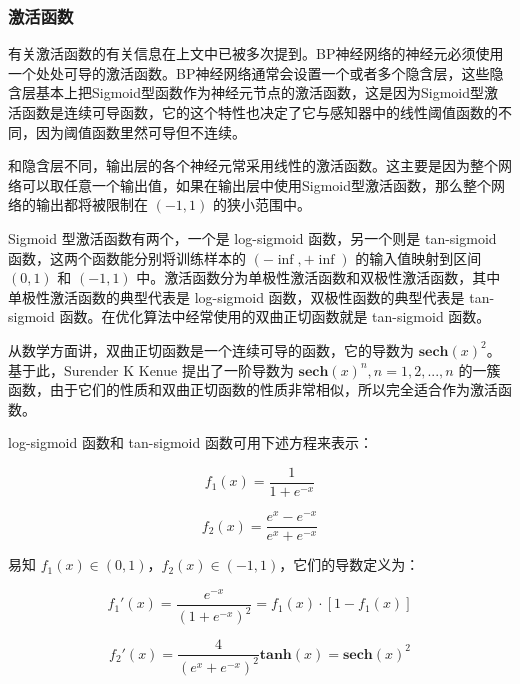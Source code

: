 \documentclass[UTF8]{ctexart}
\begin{document}
\subsubsection{激活函数}

有关激活函数的有关信息在上文中已被多次提到。BP神经网络的神经元必须使用一个处处可导的激活函数。BP神经网络通常会设置一个或者多个隐含层，这些隐含层基本上把Sigmoid型函数作为神经元节点的激活函数，这是因为Sigmoid型激活函数是连续可导函数，它的这个特性也决定了它与感知器中的线性阈值函数的不同，因为阈值函数里然可导但不连续。 \par

和隐含层不同，输出层的各个神经元常采用线性的激活函数。这主要是因为整个网络可以取任意一个输出值，如果在输出层中使用Sigmoid型激活函数，那么整个网络的输出都将被限制在 $(-1,1)$ 的狭小范围中。 \par

Sigmoid 型激活函数有两个，一个是 log-sigmoid 函数，另一个则是 tan-sigmoid 函数，这两个函数能分别将训练样本的 $(-\inf, + \inf)$ 的输入值映射到区间 $(0,1)$ 和 $(-1,1)$ 中。激活函数分为单极性激活函数和双极性激活函数，其中单极性激活函数的典型代表是 log-sigmoid 函数，双极性函数的典型代表是 tan-sigmoid 函数。在优化算法中经常使用的双曲正切函数就是 tan-sigmoid 函数。 \par
从数学方面讲，双曲正切函数是一个连续可导的函数，它的导数为 $\mathbf{sech}(x)^2$。基于此，Surender K Kenue 提出了一阶导数为 $\mathbf{sech}(x)^n, n=1,2,...,n$ 的一簇函数，由于它们的性质和双曲正切函数的性质非常相似，所以完全适合作为激活函数。 \par

log-sigmoid 函数和 tan-sigmoid 函数可用下述方程来表示： \par


\begin{equation}
f_1(x)=\frac{1}{1+e^{-x}}
\end{equation}

\begin{equation}
f_2(x)=\frac{e^x-e^{-x}}{e^x+e^{-x}}
\end{equation}

易知 $f_1(x) \in (0,1)$，$f_2(x) \in (-1,1)$，它们的导数定义为：

\begin{equation}
f_1'(x)=\frac{e^{-x}}{(1+e^{-x})^2} = f_1(x) \cdot [1-f_1(x)]
\end{equation}

\begin{equation}
f_2'(x)= \frac{4}{(e^x+e^{-x})^2} \mathbf{tanh}(x) = \mathbf{sech}(x)^2
\end{equation}
\end{document}
